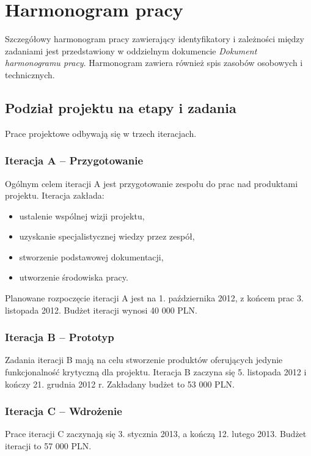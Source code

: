 \newpage
\section{Harmonogram pracy}

Szczegółowy harmonogram pracy zawierający identyfikatory i zależności między
zadaniami jest przedstawiony w oddzielnym dokumencie \emph{Dokument harmonogramu
pracy}. Harmonogram zawiera również spis zasobów osobowych i technicznych.

\subsection{Podział projektu na etapy i zadania}

Prace projektowe odbywają się w trzech iteracjach.

\subsubsection{Iteracja A -- Przygotowanie}
Ogólnym celem iteracji A jest przygotowanie zespołu do prac nad produktami
projektu. Iteracja zakłada:
\begin{itemize}[nosep]
     \item ustalenie wspólnej wizji projektu,
     \item uzyskanie specjalistycznej wiedzy przez zespół,
     \item stworzenie podstawowej dokumentacji,
     \item utworzenie środowiska pracy.
 \end{itemize}

\noindent Planowane rozpoczęcie iteracji A jest na 1. października 2012, z
końcem prac 3. listopada 2012. Budżet iteracji wynosi 40 000 PLN.

\subsubsection{Iteracja B -- Prototyp}
Zadania iteracji B mają na celu stworzenie produktów oferujących jedynie
funkcjonalność krytyczną dla projektu. Iteracja B zaczyna się 5. listopada 2012
i kończy 21. grudnia 2012 r. Zakładany budżet to 53 000 PLN.

\subsubsection{Iteracja C -- Wdrożenie}
Prace iteracji C zaczynają się 3. stycznia 2013, a kończą 12. lutego 2013.
Budżet iteracji to 57 000 PLN.
